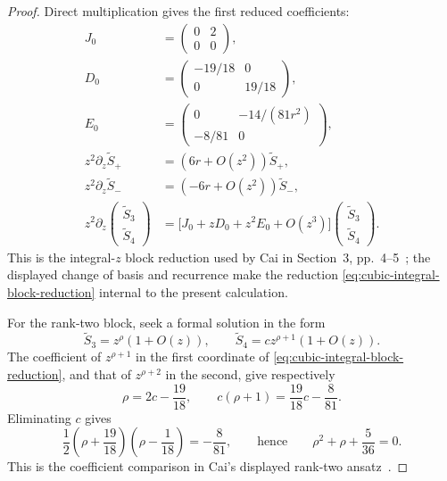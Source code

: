 \begin{proof}
Direct multiplication gives the first reduced coefficients:
\[
 \begin{aligned}
 J_0&=\begin{pmatrix}0&2\\0&0\end{pmatrix},\\
 D_0&=\begin{pmatrix}-19/18&0\\0&19/18\end{pmatrix},\\
 E_0&=\begin{pmatrix}0&-14/(81r^2)\\-8/81&0\end{pmatrix},\\
 z^2\partial_z\widetilde S_+&=(6r+O(z^2))\widetilde S_+,\\
 z^2\partial_z\widetilde S_-&=(-6r+O(z^2))\widetilde S_-,\\
 z^2\partial_z
 \begin{pmatrix}\widetilde S_3\\\widetilde S_4\end{pmatrix}
 &=\bigl[J_0+zD_0+z^2E_0+O(z^3)\bigr]
 \begin{pmatrix}\widetilde S_3\\\widetilde S_4\end{pmatrix}.
 \end{aligned}
 \tag{4.9e}
 \label{eq:cubic-integral-block-reduction}
\]
This is the integral-\(z\) block reduction used by Cai in Section~3,
pp.~4--5~\cite{Cai}; the displayed change of basis and recurrence make the
reduction \eqref{eq:cubic-integral-block-reduction} internal to the present
calculation.

For the rank-two block, seek a formal solution in the form
\[
 \widetilde S_3=z^\rho(1+O(z)),
 \qquad
 \widetilde S_4=cz^{\rho+1}(1+O(z)).
 \tag{4.9f}
 \label{eq:cubic-indicial-ansatz}
\]
The coefficient of \(z^{\rho+1}\) in the first coordinate of
\eqref{eq:cubic-integral-block-reduction}, and that of \(z^{\rho+2}\) in
the second, give respectively
\[
 \rho=2c-\frac{19}{18},
 \qquad
 c(\rho+1)=\frac{19}{18}c-\frac8{81}.
 \tag{4.9g}
 \label{eq:cubic-indicial-coefficients}
\]
Eliminating \(c\) gives
\[
 \frac12\left(\rho+\frac{19}{18}\right)
 \left(\rho-\frac1{18}\right)=-\frac8{81},
 \qquad\text{hence}\qquad
 \rho^2+\rho+\frac5{36}=0.
 \tag{4.9h}
 \label{eq:cubic-indicial-polynomial}
\]
This is the coefficient comparison in Cai's displayed rank-two
ansatz~\cite[p.~6]{Cai}.


\end{proof}
